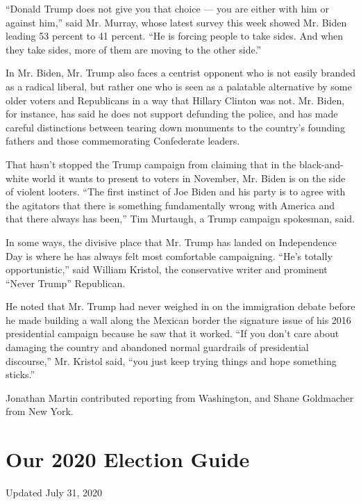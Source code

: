``Donald Trump does not give you that choice --- you are either with him
or against him,'' said Mr. Murray, whose latest survey this week showed
Mr. Biden leading 53 percent to 41 percent. ``He is forcing people to
take sides. And when they take sides, more of them are moving to the
other side.''

In Mr. Biden, Mr. Trump also faces a centrist opponent who is not easily
branded as a radical liberal, but rather one who is seen as a palatable
alternative by some older voters and Republicans in a way that Hillary
Clinton was not. Mr. Biden, for instance, has said he does not support
defunding the police, and has made careful distinctions between tearing
down monuments to the country's founding fathers and those commemorating
Confederate leaders.

That hasn't stopped the Trump campaign from claiming that in the
black-and-white world it wants to present to voters in November, Mr.
Biden is on the side of violent looters. ``The first instinct of Joe
Biden and his party is to agree with the agitators that there is
something fundamentally wrong with America and that there always has
been,'' Tim Murtaugh, a Trump campaign spokesman, said.

In some ways, the divisive place that Mr. Trump has landed on
Independence Day is where he has always felt most comfortable
campaigning. ``He's totally opportunistic,'' said William Kristol, the
conservative writer and prominent ``Never Trump'' Republican.

He noted that Mr. Trump had never weighed in on the immigration debate
before he made building a wall along the Mexican border the signature
issue of his 2016 presidential campaign because he saw that it worked.
``If you don't care about damaging the country and abandoned normal
guardrails of presidential discourse,'' Mr. Kristol said, ``you just
keep trying things and hope something sticks.''

Jonathan Martin contributed reporting from Washington, and Shane
Goldmacher from New York.

\hypertarget{our-2020-election-guide}{%
\section{Our 2020 Election Guide}\label{our-2020-election-guide}}

Updated July 31, 2020

